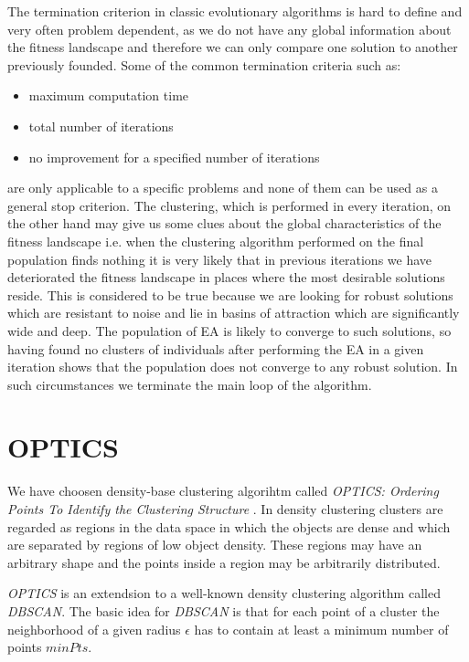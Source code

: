 The termination criterion in classic evolutionary algorithms is hard to define
and very often problem dependent, as we do not have any global information about 
the fitness landscape and therefore we can only compare one solution to another
previously founded. 
Some of the common termination criteria such as: 
\begin{itemize}
  \item maximum computation time
  \item total number of iterations
  \item no improvement for a specified number of iterations
\end{itemize}
are only applicable to a specific problems and none of them can be used
as a general stop criterion. 
The clustering, which is performed in every iteration, 
on the other hand may give us some clues about the global
characteristics of the fitness landscape i.e. when the clustering algorithm performed 
on the final population finds nothing it is very likely that in previous
iterations we have deteriorated the fitness landscape in places where 
the most desirable solutions reside. 
This is considered to be true because we are looking for robust 
solutions which are resistant to noise and lie in basins of attraction 
which are significantly wide and deep. The population of EA is likely 
to converge to such solutions, so having found no clusters of individuals after
performing the EA in a given iteration shows that the population does not converge 
to any robust solution. In such circumstances we terminate the main loop
of the algorithm.

\section{OPTICS}

We have choosen density-base clustering algorihtm called \textit{OPTICS:
Ordering Points To Identify the Clustering Structure} \cite{optics}. In density
clustering clusters are regarded as regions in the data space in which the objects are 
dense and which are separated by regions of low object density. These regions
may have an arbitrary shape and the points inside a region may be arbitrarily
distributed.

\textit{OPTICS} is an extendsion to a well-known density clustering algorithm
called \textit{DBSCAN}. The basic idea for \textit{DBSCAN} is that for each
point of a cluster the neighborhood of a given radius $\epsilon$ has to contain
at least a minimum number of points $minPts$.

